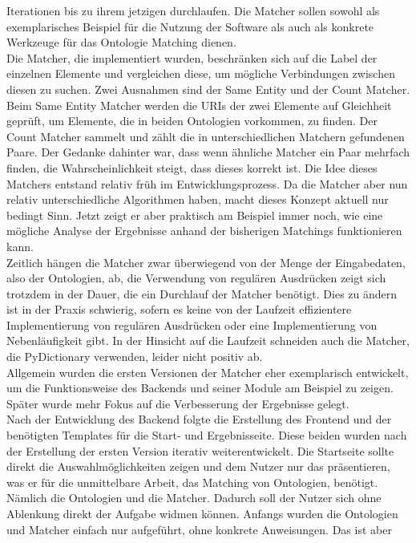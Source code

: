 Iterationen bis zu ihrem jetzigen durchlaufen. Die Matcher sollen sowohl als
exemplarisches Beispiel für die Nutzung der Software als auch als konkrete
Werkzeuge für das Ontologie Matching dienen.\\
Die Matcher, die implementiert wurden, beschränken sich auf die Label der
einzelnen Elemente und vergleichen diese, um mögliche Verbindungen zwischen
diesen zu suchen. Zwei Ausnahmen sind der Same Entity und der Count Matcher.
Beim Same Entity Matcher werden die URIs der zwei Elemente auf Gleichheit
geprüft, um Elemente, die in beiden Ontologien vorkommen, zu finden. Der Count
Matcher sammelt und zählt die in unterschiedlichen Matchern gefundenen Paare. 
Der Gedanke dahinter war, dass wenn ähnliche Matcher ein Paar mehrfach finden,
die Wahrscheinlichkeit steigt, dass dieses korrekt ist. Die Idee dieses
Matchers entstand relativ früh im Entwicklungsprozess. Da die Matcher aber nun
relativ unterschiedliche Algorithmen haben, macht dieses Konzept aktuell nur
bedingt Sinn. Jetzt zeigt er aber praktisch am Beispiel immer noch, wie eine
mögliche Analyse der Ergebnisse anhand der bisherigen Matchings funktionieren kann.\\
Zeitlich hängen die Matcher zwar überwiegend von der Menge
der Eingabedaten, also der Ontologien, ab, die Verwendung von regulären Ausdrücken
zeigt sich trotzdem in der Dauer, die ein Durchlauf der Matcher benötigt. Dies
zu ändern ist in der Praxis schwierig, sofern es keine von der Laufzeit
effizientere Implementierung von regulären Ausdrücken oder eine Implementierung
von Nebenläufigkeit gibt.
In der Hinsicht auf die Laufzeit
schneiden auch die Matcher, die PyDictionary verwenden, leider nicht
positiv ab.\\
Allgemein wurden die ersten Versionen der Matcher eher exemplarisch
entwickelt, um die Funktionsweise des Backends und seiner Module am Beispiel zu
zeigen. Später wurde mehr Fokus auf die Verbesserung der Ergebnisse gelegt.\\
Nach der Entwicklung des Backend folgte die Erstellung des Frontend und der
benötigten Templates für die Start- und Ergebnisseite. Diese beiden wurden nach
der Erstellung der ersten Version iterativ weiterentwickelt. Die Startseite
sollte direkt die Auswahlmöglichkeiten zeigen und dem Nutzer nur das
präsentieren, was er für die unmittelbare Arbeit, das Matching von Ontologien,
benötigt. Nämlich die Ontologien und die Matcher. Dadurch soll der Nutzer sich
ohne Ablenkung direkt der Aufgabe widmen können. Anfangs wurden die Ontologien
und Matcher einfach nur aufgeführt, ohne konkrete Anweisungen. Das ist aber
